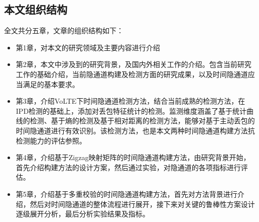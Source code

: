 \subsection{本文组织结构}
\label{sec:intro:work:struct}

全文共分五章，文章的组织结构如下：
\begin{itemize}
    \item 第1章，对本文的研究领域及主要内容进行介绍
    \item 第2章，本文中涉及到的研究背景，及国内外相关工作的介绍。包含当前研究工作的基础介绍，当前隐通道构建及检测方面的研究成果，以及时间隐通道应当满足的基本要求。
    \item 第3章，介绍VoLTE下时间隐通道检测方法，结合当前成熟的检测方法，在IPD检测的基础上，添加对丢包特征统计的检测。监测维度涵盖了基于统计曲线的检测、基于熵的检测及基于相对距离的检测方法，能够对基于主动丢包的时间隐通道进行有效识别。该检测方法，也是本文两种时间隐通道构建方法抗检测能力的评估参照。
    \item 第4章，介绍基于Zigzag映射矩阵的时间隐通道构建方法，由研究背景开始，首先介绍构建方法的设计方案，然后通过实验，对隐通道的各项指标进行评估。
    \item 第5章，介绍基于多重校验的时间隐通道构建方法，首先对方法背景进行介绍，然后对时间隐通道的整体流程进行展开，接下来对关键的鲁棒性方案设计逐级展开分析，最后分析实验结果及指标。
\end{itemize}